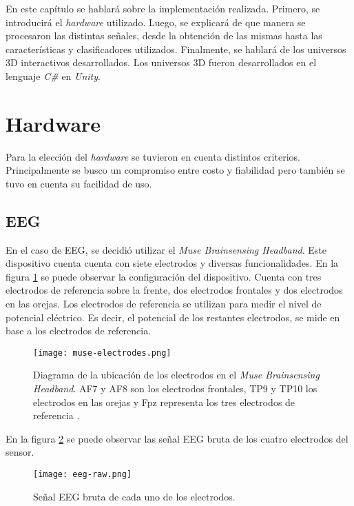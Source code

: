 En este capítulo se hablará sobre la implementación realizada. Primero, se introducirá el \emph{hardware} utilizado. Luego, se explicará de que manera se procesaron las distintas señales, desde la obtención de las mismas hasta las características y clasificadores utilizados. Finalmente, se hablará de los universos 3D interactivos desarrollados. Los universos 3D fueron desarrollados en el lenguaje \emph{C\#} en \emph{Unity}.

\section{Hardware}

Para la elección del \emph{hardware} se tuvieron en cuenta distintos criterios. Principalmente se busco un compromiso entre costo y fiabilidad pero también se tuvo en cuenta su facilidad de uso.

\subsection{EEG}

En el caso de EEG, se decidió utilizar el \emph{Muse Brainsensing Headband}. Este dispositivo cuenta cuenta con siete electrodos y diversas funcionalidades. En la figura \ref{fig:muse-electrodes} se puede observar la configuración del dispositivo. Cuenta con tres electrodos de referencia sobre la frente, dos electrodos frontales y dos electrodos en las orejas. Los electrodos de referencia se utilizan para medir el nivel de potencial eléctrico. Es decir, el potencial de los restantes electrodos, se mide en base a los electrodos de referencia.

\begin{figure}[H]
	\centering
    \texttt{[image: muse-electrodes.png]}
    \caption{Diagrama de la ubicación de los electrodos en el \emph{Muse Brainsensing Headband}. AF7 y AF8 son los electrodos frontales, TP9 y TP10 los electrodos en las orejas y Fpz representa los tres electrodos de referencia \cite{muse-hardware}.}
	\label{fig:muse-electrodes}
\end{figure}

En la figura \ref{fig:eeg-raw} se puede observar las señal EEG bruta de los cuatro electrodos del sensor.

\begin{figure}[H]
	\centering
    \texttt{[image: eeg-raw.png]}
    \caption{Señal EEG bruta de cada uno de los electrodos.}
	\label{fig:eeg-raw}
\end{figure}

